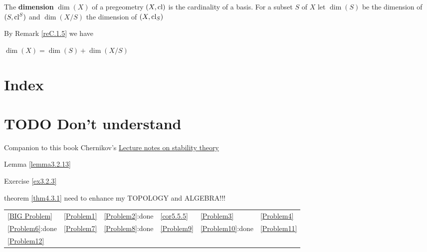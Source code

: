 \documentclass[11pt]{article}
\begin{document}
\begin{definition}[]
The \textbf{dimension} \(\dim(X)\) of a pregeometry \((X,\operatorname{\text{cl}})\) is the cardinality of a basis. For a
subset \(S\) of \(X\) let \(\dim(S)\) be the dimension of \((S,\operatorname{\text{cl}}^S)\) and \(\dim(X/S)\) the
dimension of \((X,\operatorname{\text{cl}}_S)\)
\end{definition}

By Remark \ref{reC.1.5} we have
\begin{lemma}[]
\label{lemmaC.1.8}
\(\dim(X)=\dim(S)+\dim(X/S)\)
\end{lemma}


\section{Index}
\label{sec:org13dd69f}
\renewcommand{\indexname}{}
\printindex
\section{{\bfseries\sffamily TODO} Don't understand}
\label{sec:orgedf2a6f}
Companion to this book
Chernikov's \href{https://www.math.ucla.edu/\~chernikov/teaching/StabilityTheory285D/StabilityNotes.pdf}{Lecture notes on stability theory}

Lemma \ref{lemma3.2.13}

Exercise \ref{ex3.2.3}

theorem \ref{thm4.3.1} need to enhance my TOPOLOGY and ALGEBRA!!!

\begin{center}
\begin{tabular}{llllll}
\hline
\ref{BIG Problem} & \ref{Problem1} & \ref{Problem2}:done & \ref{cor5.5.5} & \ref{Problem3} & \ref{Problem4}\\
\ref{Problem6}:done & \ref{Problem7} & \ref{Problem8}:done & \ref{Problem9} & \ref{Problem10}:done & \ref{Problem11}\\
\ref{Problem12} &  &  &  &  & \\
\end{tabular}
\end{center}
\end{document}
